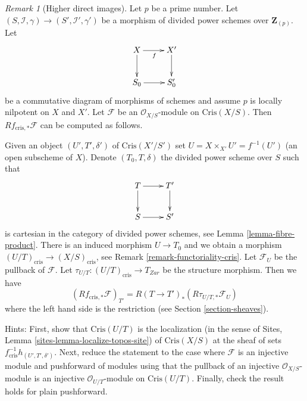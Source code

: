 \documentclass{stacks-project}
\theoremstyle{plain}
\theoremstyle{definition}
\theoremstyle{remark}
\newtheorem{remark}[subsection]{Remark}
\numberwithin{equation}{subsection}
\begin{document}
\begin{remark}[Higher direct images]
\label{remark-compute-direct-image}
Let $p$ be a prime number. Let
$(S, \mathcal{I}, \gamma) \to (S', \mathcal{I}', \gamma')$ be
a morphism of divided power schemes over $\mathbf{Z}_{(p)}$. Let
$$
\xymatrix{
X \ar[r]_f \ar[d] & X' \ar[d] \\
S_0 \ar[r] & S'_0
}
$$
be a commutative diagram of morphisms of schemes and assume $p$ is
locally nilpotent on $X$ and $X'$. Let $\mathcal{F}$ be an
$\mathcal{O}_{X/S}$-module on $\text{Cris}(X/S)$. Then
$Rf_{\text{cris}, *}\mathcal{F}$ can be computed as follows.

\medskip\noindent
Given an object $(U', T', \delta')$ of $\text{Cris}(X'/S')$ set
$U = X \times_{X'} U' = f^{-1}(U')$ (an open subscheme of $X$). Denote
$(T_0, T, \delta)$ the divided power scheme over $S$ such that
$$
\xymatrix{
T \ar[r] \ar[d] & T' \ar[d] \\
S \ar[r] & S'
}
$$
is cartesian in the category of divided power schemes, see
Lemma \ref{lemma-fibre-product}. There is an
induced morphism $U \to T_0$ and we obtain a morphism
$(U/T)_{\text{cris}} \to (X/S)_{\text{cris}}$, see
Remark \ref{remark-functoriality-cris}.
Let $\mathcal{F}_U$ be the pullback of $\mathcal{F}$.
Let $\tau_{U/T} : (U/T)_{\text{cris}} \to T_{Zar}$ be the structure morphism.
Then we have
\begin{equation}
\label{equation-identify-pushforward}
\left(Rf_{\text{cris}, *}\mathcal{F}\right)_{T'} =
R(T \to T')_*\left(R\tau_{U/T, *} \mathcal{F}_U \right)
\end{equation}
where the left hand side is the restriction (see
Section \ref{section-sheaves}).

\medskip\noindent
Hints: First, show that $\text{Cris}(U/T)$ is the localization (in the sense
of Sites, Lemma \ref{sites-lemma-localize-topos-site}) of $\text{Cris}(X/S)$
at the sheaf of sets $f_{\text{cris}}^{-1}h_{(U', T', \delta')}$. Next, reduce
the statement to the case where $\mathcal{F}$ is an injective module
and pushforward of modules using that the pullback of an injective
$\mathcal{O}_{X/S}$-module is an injective $\mathcal{O}_{U/T}$-module on
$\text{Cris}(U/T)$. Finally, check the result holds for plain pushforward.
\end{remark}
\end{document}
